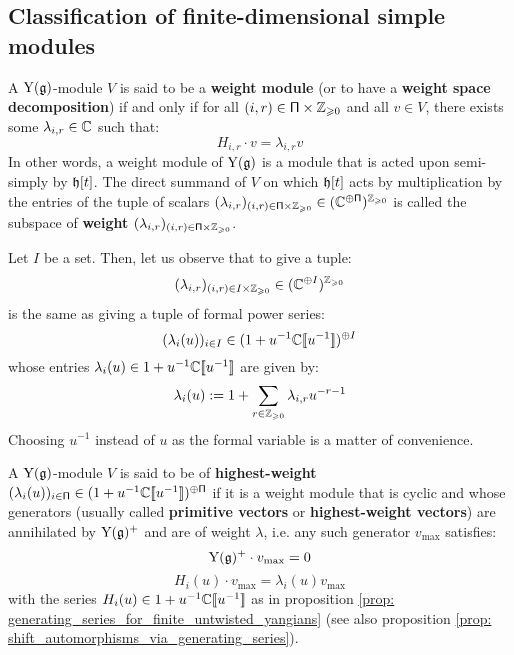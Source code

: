     \subsection{Classification of finite-dimensional simple modules}
        \begin{definition} \label{def: weight_modules_for_finite_untwisted_yangians}
            A $\mathrm{Y}(\mathfrak{g})$-module $V$ is said to be a \textbf{weight module} (or to have a \textbf{weight space decomposition}) if and only if for all $(i, r) \in \simpleroots \x \Z_{\geq 0}$ and all $v \in V$, there exists some $\lambda_{i, r} \in \mathbb{C}$ such that:
                $$H_{i, r} \cdot v = \lambda_{i, r} v$$
            In other words, a weight module of $\mathrm{Y}(\mathfrak{g})$ is a module that is acted upon semi-simply by $\mathfrak{h}[t]$. The direct summand of $V$ on which $\mathfrak{h}[t]$ acts by multiplication by the entries of the tuple of scalars $(\lambda_{i, r})_{(i, r) \in \simpleroots \x \Z_{\geq 0}} \in (\bbC^{\oplus \simpleroots})^{\Z_{\geq 0}}$ is called the subspace of \textbf{weight} $(\lambda_{i, r})_{(i, r) \in \simpleroots \x \Z_{\geq 0}}$.
        \end{definition}
        \begin{remark}
            Let $I$ be a set. Then, let us observe that to give a tuple:
                $$( \lambda_{i, r} )_{(i, r) \in I \x \Z_{\geq 0}} \in (\bbC^{\oplus I})^{\Z_{\geq 0}}$$
            is the same as giving a tuple of formal power series:
                $$( \lambda_i(u) )_{i \in I} \in (1 + u^{-1} \mathbb{C}[\![u^{-1}]\!])^{\oplus I}$$
            whose entries $\lambda_i(u) \in 1 + u^{-1} \mathbb{C}[\![u^{-1}]\!]$ are given by:
                $$\lambda_i(u) := 1 + \sum_{r \in \mathbb{Z}_{\geqslant 0}} \lambda_{i, r} u^{-r - 1}$$
            Choosing $u^{-1}$ instead of $u$ as the formal variable is a matter of convenience.
        \end{remark}
        \begin{definition} \label{def: highest_weight_modules_for_finite_untwisted_yangians}
            A $\mathrm{Y}(\mathfrak{g})$-module $V$ is said to be of \textbf{highest-weight} $( \lambda_i(u) )_{i \in \mathsf{\Pi}} \in (1 + u^{-1} \mathbb{C}[\![u^{-1}]\!])^{\oplus \mathsf{\Pi}}$ if it is a weight module that is cyclic and whose generators (usually called \textbf{primitive vectors} or \textbf{highest-weight vectors}) are annihilated by $\mathrm{Y}(\mathfrak{g})^+$ and are of weight $\lambda$, i.e. any such generator $v_{\max}$ satisfies:
                $$\mathrm{Y}(\mathfrak{g})^+ \cdot v_{\max} = 0$$
                $$H_i(u) \cdot v_{\max} = \lambda_i(u) v_{\max}$$
            with the series $H_i(u) \in 1 + u^{-1} \mathbb{C}[\![u^{-1}]\!]$ as in proposition \ref{prop: generating_series_for_finite_untwisted_yangians} (see also proposition \ref{prop: shift_automorphisms_via_generating_series}).
        \end{definition}

